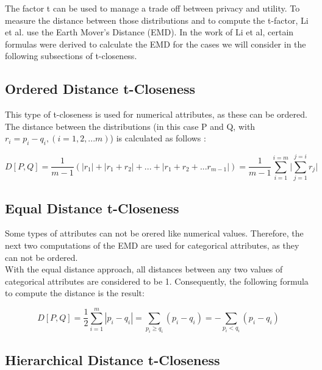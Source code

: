\documentclass[12pt, a4paper,oneside]{report}
\begin{document}
The factor t can be used to manage a trade off between privacy and utility. To measure the distance between those distributions and to compute the t-factor, Li et al. use the Earth Mover's Distance (EMD). In the work of Li et al, certain formulas were derived to calculate the EMD for the cases we will consider in the following subsections of t-closeness\cite{Li2007}.

\subsection{Ordered Distance t-Closeness}

This type of t-closeness is used for numerical attributes, as these can be ordered. The distance between the distributions (in this case P and Q, with $r_i = p_i - q_i, (i = 1,2,...m)$) is calculated as follows \cite{Li2007}:

\[ D[P,Q] = \frac{1}{m-1}(|r_1| + |r_1 + r_2| +...+ |r_1 + r_2 +...r_{m-1}|) =  \frac{1}{m-1}\sum_{i=1}^{i=m}\Biggl|\sum_{j=1}^{j=i}r_j\Biggl| \]


\subsection{Equal Distance t-Closeness}

Some types of attributes can not be orered like numerical values. Therefore, the next two computations of the EMD are used for categorical attributes, as they can not be ordered.\\
With the equal distance approach, all distances between any two values of categorical attributes are considered to be 1. Consequently, the following formula to compute the distance is the result\cite{Li2007}:

\[ D[P,Q] = \frac{1}{2}\sum_{i=1}^{m}|p_i-q_i| = \sum_{p_i \ge q_i}^{}(p_i-q_i) = - \sum_{p_i < q_i}^{}(p_i-q_i) \]

\subsection{Hierarchical Distance t-Closeness}
\end{document}

